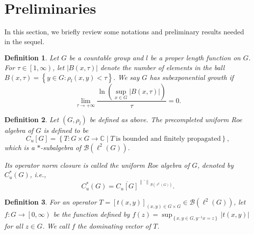 \documentclass[preprint,11pt]{elsarticle}
\newtheorem{definition}{Definition}[section]
\numberwithin{equation}{section}
\begin{document}
	
	
	
	\section{Preliminaries } 
	
	In this section, we briefly review some notations and preliminary results  needed in the sequel.
	
	\begin{definition}
		Let $G$ be a countable group and  $l$ be a proper length function on $G$. For $\tau \in \left [1,\infty  \right )$, let $\left | B(x, \tau)\right |$ denote the number of elements in the ball $B(x,\tau) =\left \{ y\in G: \rho_{l}(x,y)<\tau \right \} $.  
		We say $G$ has {\it subexponential growth} if
		\begin{equation}\label{subgrow}
			\lim_{\tau  \to +\infty} \frac{\ln(\sup_{x\in G}\left | B(x,\tau ) \right | )}{\tau} =0.
		\end{equation}
	\end{definition}
	\begin{definition}
		Let $(G,\rho _{l})$ be defined as above. The precompleted uniform Roe algebra of $G$ is defined to be
		\[C_{u}[G]=\left \{ T:G\times G\to \mathbb{C}\mid T~\text{is~bounded~and~finitely~propagated}   \right \},\]
		which is a $*$-subalgebra of $\mathcal{B}(\ell ^{2}(G))$. 
		
		Its operator norm closure is called the {\it uniform Roe algebra} of $G$, denoted by $C_{u}^{*}(G)$, i.e.,
		\[C_{u}^{*}(G)=\overline{C_{u}[G]} ^{\left \| \cdot  \right \|_{\mathcal{B}(\ell ^{2}(G))}}.\]
	\end{definition}
	\sloppy
	\begin{definition}
		For an operator $T=[t(x,y)]_{(x,y)\in G\times G} \in \mathcal{B} (\ell ^{2}(G))$, let $f:G\to \left [ 0,\infty \right )$ be the function defined by $f(z)=\sup _{\left \{x,y\in G,y^{-1}x=z \right \} } \left | t(x,y) \right | $  for all $z\in G$. We call $f$ the {\it dominating vector} of $T$.
		
	\end{definition}
\end{document}
